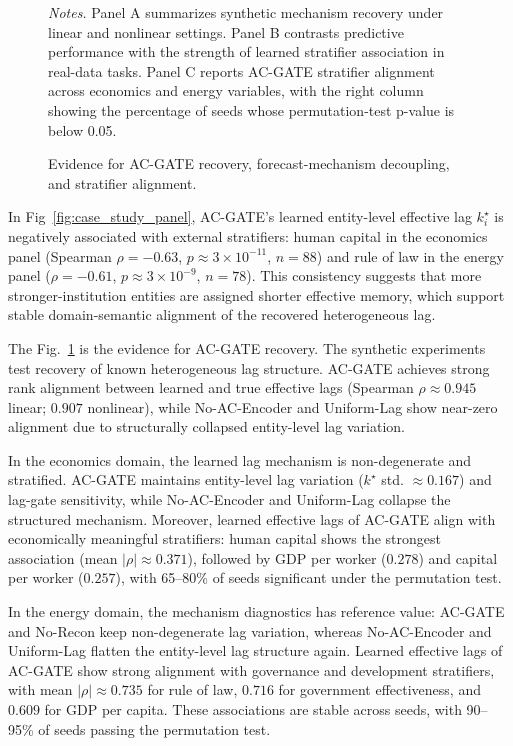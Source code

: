 \documentclass[conference]{IEEEtran}
\begin{document}
\begin{figure}[!t]
    \centering
    
    \caption{Evidence for AC-GATE recovery, forecast-mechanism decoupling, and stratifier alignment.}
    \label{fig:compact_evidence_panel}
    {\footnotesize\raggedright\textit{Notes.} Panel A summarizes synthetic mechanism recovery under linear and nonlinear settings. Panel B contrasts predictive performance with the strength of learned stratifier association in real-data tasks. Panel C reports AC-GATE stratifier alignment across economics and energy variables, with the right column showing the percentage of seeds whose permutation-test p-value is below 0.05.\par}
\end{figure}

In Fig~\ref{fig:case_study_panel}, AC-GATE's learned entity-level effective lag \(k_i^\star\) is negatively associated with external stratifiers: human capital in the economics panel (Spearman \(\rho=-0.63\), \(p\approx 3\times 10^{-11}\), \(n=88\)) and rule of law in the energy panel (\(\rho=-0.61\), \(p\approx 3\times 10^{-9}\), \(n=78\)). This consistency suggests that more stronger-institution entities are assigned shorter effective memory, which support stable domain-semantic alignment of the recovered heterogeneous lag.

The Fig.~\ref{fig:compact_evidence_panel} is the evidence for AC-GATE recovery. The synthetic experiments test recovery of known heterogeneous lag structure. AC-GATE achieves strong rank alignment between learned and true effective lags (Spearman $\rho \approx 0.945$ linear; $0.907$ nonlinear), while No-AC-Encoder and Uniform-Lag show near-zero alignment due to structurally collapsed entity-level lag variation.

In the economics domain, the learned lag mechanism is non-degenerate and stratified. AC-GATE maintains entity-level lag variation ($k^\star$ std. $\approx 0.167$) and lag-gate sensitivity, while No-AC-Encoder and Uniform-Lag collapse the structured mechanism. Moreover, learned effective lags of AC-GATE align with economically meaningful stratifiers: human capital shows the strongest association (mean $|\rho| \approx 0.371$), followed by GDP per worker ($0.278$) and capital per worker ($0.257$), with 65--80\% of seeds significant under the permutation test.

In the energy domain, the mechanism diagnostics has reference value: AC-GATE and No-Recon keep non-degenerate lag variation, whereas No-AC-Encoder and Uniform-Lag flatten the entity-level lag structure again. Learned effective lags of AC-GATE show strong alignment with governance and development stratifiers, with mean $|\rho| \approx 0.735$ for rule of law, $0.716$ for government effectiveness, and $0.609$ for GDP per capita. These associations are stable across seeds, with 90--95\% of seeds passing the permutation test.
\end{document}
